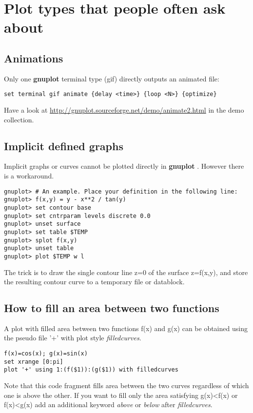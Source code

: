 \documentclass[a4paper,11pt]{article}
\def\http#1{{\small\href{http://#1}{\url{http://#1}}}}
\newcommand{\http}[1]%
            {\htmladdnormallink{\latex{\url{http://#1}}%
                    \html{\textit{http://#1}}}%
                {http://#1}%
            }
\newcommand{\gnuplot}{\textbf{gnuplot }}
\begin{document}
\section{Plot types that people often ask about}

\subsection{Animations}

Only one \gnuplot terminal type (gif) directly outputs an animated file:
\begin{verbatim}
set terminal gif animate {delay <time>} {loop <N>} {optimize}
\end{verbatim}

Have a look at
\http{gnuplot.sourceforge.net/demo/animate2.html}
in the demo collection.

\subsection{Implicit defined graphs}

Implicit graphs or curves cannot be plotted directly in \gnuplot.
However there is a workaround.
\small
\begin{verbatim}
gnuplot> # An example. Place your definition in the following line:
gnuplot> f(x,y) = y - x**2 / tan(y)
gnuplot> set contour base
gnuplot> set cntrparam levels discrete 0.0
gnuplot> unset surface
gnuplot> set table $TEMP
gnuplot> splot f(x,y)
gnuplot> unset table
gnuplot> plot $TEMP w l
\end{verbatim}
\normalsize
The trick is to draw the single contour line z=0 of the surface
z=f(x,y), and store the resulting contour curve to a temporary file or datablock.


\subsection{How to fill an area between two functions}

A plot with filled area between two functions f(x) and g(x) can be obtained using
the pseudo file '+' with  plot style {\em filledcurves}.
\small
\begin{verbatim}
f(x)=cos(x); g(x)=sin(x)
set xrange [0:pi]
plot '+' using 1:(f($1)):(g($1)) with filledcurves
\end{verbatim}
\normalsize

Note that this code fragment fills area between the two curves regardless of
which one is above the other.  If you want to fill only the area satisfying g(x)<f(x)
or f(x)<g(x)
add an additional keyword {\em above} or {\em below} after {\em filledcurves}.
\end{document}
